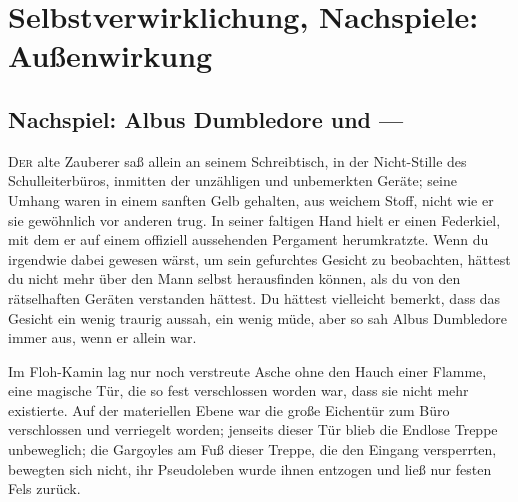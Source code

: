 \chapter{Selbstverwirklichung, Nachspiele: Außenwirkung}

\section{Nachspiel: Albus Dumbledore und —}

\lettrine{D}{er} alte Zauberer saß allein an seinem Schreibtisch, in der Nicht-Stille des Schulleiterbüros, inmitten der unzähligen und unbemerkten Geräte; seine Umhang waren in einem sanften Gelb gehalten, aus weichem Stoff, nicht wie er sie gewöhnlich vor anderen trug. In seiner faltigen Hand hielt er einen Federkiel, mit dem er auf einem offiziell aussehenden Pergament herumkratzte. Wenn du irgendwie dabei gewesen wärst, um sein gefurchtes Gesicht zu beobachten, hättest du nicht mehr über den Mann selbst herausfinden können, als du von den rätselhaften Geräten verstanden hättest. Du hättest vielleicht bemerkt, dass das Gesicht ein wenig traurig aussah, ein wenig müde, aber so sah Albus Dumbledore immer aus, wenn er allein war.

Im Floh-Kamin lag nur noch verstreute Asche ohne den Hauch einer Flamme, eine magische Tür, die so fest verschlossen worden war, dass sie nicht mehr existierte. Auf der materiellen Ebene war die große Eichentür zum Büro verschlossen und verriegelt worden; jenseits dieser Tür blieb die Endlose Treppe unbeweglich; die Gargoyles am Fuß dieser Treppe, die den Eingang versperrten, bewegten sich nicht, ihr Pseudoleben wurde ihnen entzogen und ließ nur festen Fels zurück.

